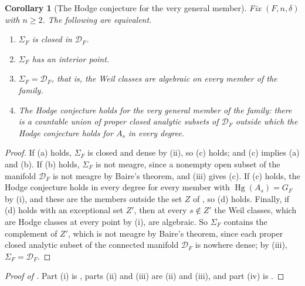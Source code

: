 \documentclass[11pt,reqno]{amsart}
\theoremstyle{plain}
\newtheorem{corollary}[theorem]{Corollary}
\theoremstyle{definition}
\theoremstyle{remark}
\newcommand{\cD}{\mathcal{D}}
\DeclareMathOperator{\Hg}{Hg}
\begin{document}
\begin{corollary}[The Hodge conjecture for the very general member]
\label{cor:verygeneral}
Fix $(F,n,\delta)$ with $n\ge2$. The following are equivalent.
\begin{enumerate}[label=\textup{(\alph*)},leftmargin=2.6em,itemsep=2pt]
\item $\Sigma_{F}$ is closed in $\cD_{F}$.
\item $\Sigma_{F}$ has an interior point.
\item $\Sigma_{F}=\cD_{F}$, that is, the Weil classes are algebraic on every
  member of the family.
\item The Hodge conjecture holds for the very general member of the family:
  there is a countable union of proper closed analytic subsets of $\cD_{F}$
  outside which the Hodge conjecture holds for $A_{s}$ in every degree.
\end{enumerate}
\end{corollary}

\begin{proof}
If (a) holds, $\Sigma_{F}$ is closed and dense by
(ii), so (c) holds; and (c) implies (a) and (b). If
(b) holds, $\Sigma_{F}$ is not meagre, since a nonempty open subset of the
manifold $\cD_{F}$ is not meagre by Baire's theorem, and
(iii) gives (c). If (c) holds, the Hodge conjecture
holds in every degree for every member with $\Hg(A_{s})=G_{F}$ by
(i), and these are the members outside the set $Z$ of
, so (d) holds. Finally, if (d) holds with an exceptional
set $Z'$, then at every $s\notin Z'$ the Weil classes, which are Hodge classes
at every point by (i), are algebraic. So $\Sigma_{F}$
contains the complement of $Z'$, which is not meagre by Baire's theorem,
since each proper closed analytic subset of the connected manifold $\cD_{F}$
is nowhere dense; by (iii), $\Sigma_{F}=\cD_{F}$.
\end{proof}

\begin{proof}[Proof of ]
Part (i) is , parts (ii) and (iii) are
(ii) and (iii), and part (iv) is
.
\end{proof}
\end{document}
